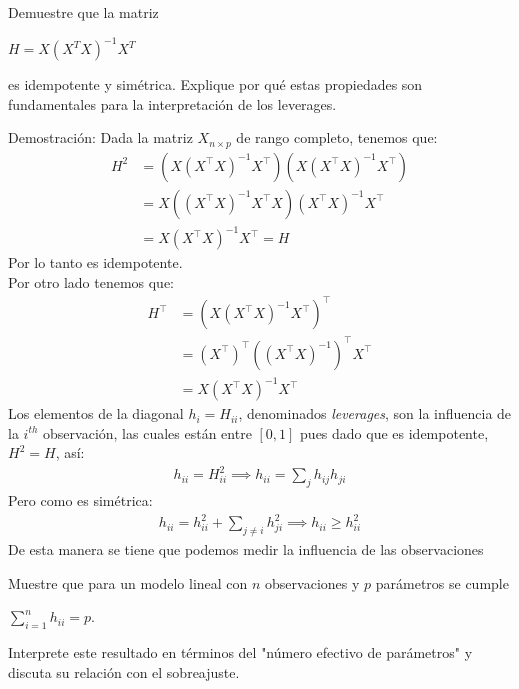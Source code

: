 \documentclass[a4paper,11pt]{article}
\begin{document}
\begin{ejercicio}{1}
    Demuestre que la matriz

    $H = X(X^{T}X)^{-1}X^{T}$

    es idempotente y simétrica. Explique por qué estas propiedades son fundamentales para
    la interpretación de los leverages.
\end{ejercicio}
\begin{demostracion} {Demostración:}
    Dada  la matriz $X_{n\times p} $ de rango completo, tenemos que:
    \begin{align*}
        H^2 & =\left(X(X^\top X)^{-1}X^\top\right)\left(X(X^\top X)^{-1}X^\top\right) \\
            & =X\left((X^\top X)^{-1}X^\top X\right)(X^\top X)^{-1}X^\top             \\
            & =X (X^\top X)^{-1}X^\top=H
    \end{align*}
    Por lo tanto es idempotente.\\
    Por otro lado tenemos que:
    \begin{align*}
        H^\top & =\left(X (X^\top X)^{-1 }X^\top \right)^\top           \\
               & =(X^\top)^\top\left((X^\top X)^{-1}\right)^\top X^\top \\
               & =X(X^\top X)^{-1}X^\top
    \end{align*}
    Los elementos de la diagonal $h_{i}=H_{ii} $, denominados \textit{leverages}, son la influencia de la $i^{th} $ observación, las cuales están entre $[0,1]$  pues dado que es idempotente, $H^2=H$, así:
    \begin{align*}
        h_{ii}=H^2_{ii}\implies h_{ii}=\sum_{j}h_{ij}h_{ji}
    \end{align*}
    Pero como es simétrica:
    \begin{align*}
        h_{ii}=h_{ii}^2+\sum_{j\not=i}h_{ji}^2\implies h_{ii}\geq h_{ii}^2
    \end{align*}
    De esta manera se tiene que podemos medir la influencia de las observaciones
\end{demostracion}
\newpage
\begin{ejercicio}{2}
    Muestre que para un modelo lineal con $n$ observaciones y $p$ parámetros se cumple

    $\sum_{i=1}^{n} h_{ii} = p$.

    Interprete este resultado en términos del "número efectivo de parámetros" y discuta su
    relación con el sobreajuste.
\end{ejercicio}
\end{document}

